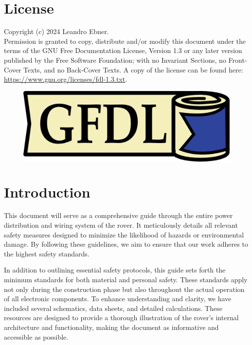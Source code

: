 \section{License}

    Copyright (c)  2024 Leandro Ebner. \\
    Permission is granted to copy, distribute and/or modify this document under the terms of the GNU Free Documentation License, Version 1.3 or any later version published by the Free Software Foundation; with no Invariant Sections, no Front-Cover Texts, and no Back-Cover Texts. A copy of the license can be found here:
    \href{https://www.gnu.org/licenses/fdl-1.3.txt}{https://www.gnu.org/licenses/fdl-1.3.txt}.

    \begin{figure}[h!]
    \includegraphics{contents/figures/gfdl-logo.png}
    \end{figure}
    
\section{Introduction}

    This document will serve as a comprehensive guide through the entire power distribution and wiring system of the rover. It meticulously details all relevant safety measures designed to minimize the likelihood of hazards or environmental damage. By following these guidelines, we aim to ensure that our work adheres to the highest safety standards. 

    \vspace{5mm}

    In addition to outlining essential safety protocols, this guide sets forth the minimum standards for both material and personal safety. These standards apply not only during the construction phase but also throughout the actual operation of all electronic components. To enhance understanding and clarity, we have included several schematics, data sheets, and detailed calculations. These resources are designed to provide a thorough illustration of the rover's internal architecture and functionality, making the document as informative and accessible as possible.

